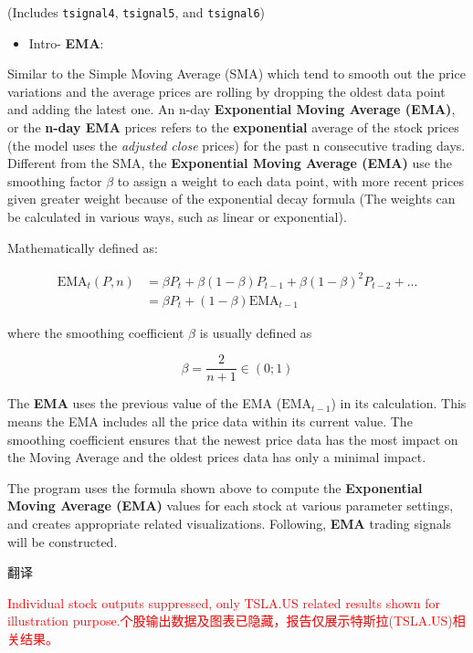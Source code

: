 \documentclass[
]{book}
\providecommand{\tightlist}{%
  \setlength{\itemsep}{0pt}\setlength{\parskip}{0pt}}
\begin{document}
(Includes \texttt{tsignal4}, \texttt{tsignal5}, and \texttt{tsignal6})

\begin{itemize}
\tightlist
\item
  Intro- \textbf{EMA}:
\end{itemize}

Similar to the Simple Moving Average (SMA) which tend to smooth out the
price variations and the average prices are rolling by dropping the
oldest data point and adding the latest one. An n-day
\textbf{Exponential Moving Average (EMA)}, or the \textbf{n-day EMA}
prices refers to the \textbf{exponential} average of the stock prices
(the model uses the \emph{adjusted close} prices) for the past n
consecutive trading days. Different from the SMA, the
\textbf{Exponential Moving Average (EMA)} use the smoothing factor
\(\beta\) to assign a weight to each data point, with more recent prices
given greater weight because of the exponential decay formula (The
weights can be calculated in various ways, such as linear or
exponential).

Mathematically defined as:

\[\begin{aligned}
\text{EMA}_t(P,n)&=\beta P_{t}+\beta(1-\beta)P_{t-1}+\beta(1-\beta)^{2}P_{t-2}+... \\
&= \beta P_{t}+(1-\beta)\text{EMA}_{t-1}
\end{aligned}\]

where the smoothing coefficient \(\beta\) is usually defined as

\[\beta=\frac{2}{n+1} \in (0;1)\]

The \textbf{EMA} uses the previous value of the EMA
(\(\text{EMA}_{t-1}\)) in its calculation. This means the EMA includes
all the price data within its current value. The smoothing coefficient
ensures that the newest price data has the most impact on the Moving
Average and the oldest prices data has only a minimal impact.

The program uses the formula shown above to compute the
\textbf{Exponential Moving Average (EMA)} values for each stock at
various parameter settings, and creates appropriate related
visualizations. Following, \textbf{EMA} trading signals will be
constructed.

翻译

\textcolor{red}{Individual stock outputs suppressed, only TSLA.US related results shown for illustration purpose.个股输出数据及图表已隐藏，报告仅展示特斯拉(TSLA.US)相关结果。}
\end{document}
